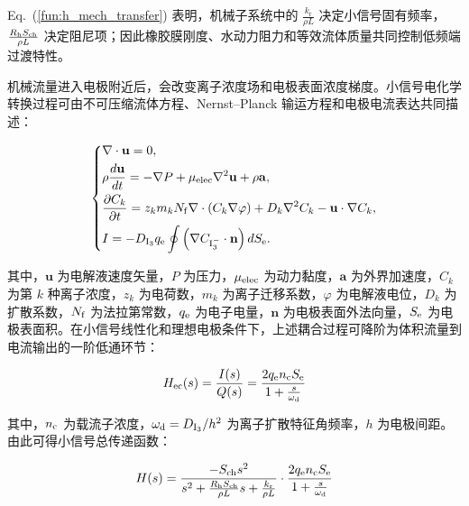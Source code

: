 \documentclass[sn-nature]{sn-jnl}
\newif\ifCNENEnglish
\newif\ifCNENBilingual
\newcommand{\CNEN}[2]{%
    \ifCNENBilingual
        #1%
        \if\relax\detokenize{#2}\relax\else\par #2\fi%
    \else
        \ifCNENEnglish
            #2%
        \else
            #1%
        \fi
    \fi
}
\newcommand{\kr}{k_{\text{r}}} %
\begin{document}
\CNEN{Eq.~(\ref{fun:h_mech_transfer}) 表明，机械子系统中的 $\frac{\kr}{\rho L}$ 决定小信号固有频率，$\frac{R_{\text{h}} S_{\rm ch}}{\rho L}$ 决定阻尼项；因此橡胶膜刚度、水动力阻力和等效流体质量共同控制低频端过渡特性。}{}

\CNEN{机械流量进入电极附近后，会改变离子浓度场和电极表面浓度梯度。小信号电化学转换过程可由不可压缩流体方程、Nernst--Planck 输运方程和电极电流表达共同描述\cite{sun_influence_2011,sun_numerical_2012}：}{}

\begin{equation}
    \left\{
    \begin{aligned}
         & \nabla \cdot \mathbf{u} = 0, \\
         & \rho \frac{d\mathbf{u}}{dt} = -\nabla P + \mu_{\rm elec}\nabla^2\mathbf{u} + \rho \mathbf{a}, \\
         & \frac{\partial C_k}{\partial t} =
         z_k m_k N_{\rm f} \nabla \cdot \left(C_k \nabla \varphi\right)
         + D_k \nabla^2 C_k - \mathbf{u}\cdot\nabla C_k, \\
         & I = -D_{\mathrm{I}_3} q_{\rm e} \oint
         \left(\nabla C_{\mathrm{I}_3^-}\cdot\mathbf{n}\right)dS_{\rm e}.
    \end{aligned}
    \label{eq:small_signal_transport}
    \right.
\end{equation}

\CNEN{其中，$\mathbf{u}$ 为电解液速度矢量，$P$ 为压力，$\mu_{\rm elec}$ 为动力黏度，$\mathbf{a}$ 为外界加速度，$C_k$ 为第 $k$ 种离子浓度，$z_k$ 为电荷数，$m_k$ 为离子迁移系数，$\varphi$ 为电解液电位，$D_k$ 为扩散系数，$N_{\rm f}$ 为法拉第常数，$q_{\rm e}$ 为电子电量，$\mathbf{n}$ 为电极表面外法向量，$S_{\rm e}$ 为电极表面积。在小信号线性化和理想电极条件下，上述耦合过程可降阶为体积流量到电流输出的一阶低通环节\cite{kozlov_frequency_2002,WOS:000318036400036}：}{}

\begin{equation}
    H_{\rm ec}(s) = \frac{I(s)}{Q(s)} = \frac{2 q_{\rm e} n_{\rm c} S_{\rm e}}{1 + \frac{s}{\omega_{\rm d}}}
    \label{fun:h_ec_transfer}
\end{equation}

\CNEN{其中，$n_{\rm c}$ 为载流子浓度，$\omega_{\rm d}=D_{\mathrm{I}_3}/h^2$ 为离子扩散特征角频率，$h$ 为电极间距。由此可得小信号总传递函数：}{}

\begin{equation}
    H(s) = \frac{- S_{\rm ch} s^2}{s^2 + \frac{R_{\text{h}} S_{\rm ch}}{\rho L}s + \frac{\kr}{\rho L }}
    \cdot
    \frac{2 q_{\rm e} n_{\rm c} S_{\rm e}}{1 + \frac{s}{\omega_{\rm d}}}
    \label{fun:h_transfer}
\end{equation}
\end{document}
